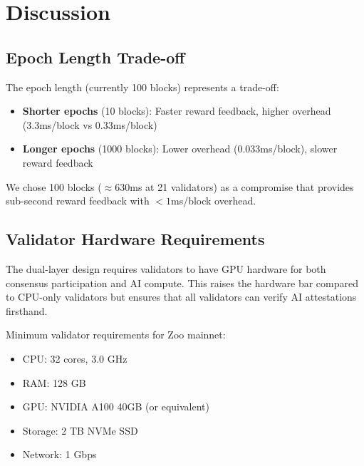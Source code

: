 \section{Discussion}


\subsection{Epoch Length Trade-off}

The epoch length (currently 100 blocks) represents a trade-off:

\begin{itemize}
    \item \textbf{Shorter epochs} (10 blocks): Faster reward feedback, higher overhead (3.3ms/block vs 0.33ms/block)
    \item \textbf{Longer epochs} (1000 blocks): Lower overhead (0.033ms/block), slower reward feedback
\end{itemize}

We chose 100 blocks ($\approx$630ms at 21 validators) as a compromise that provides sub-second reward feedback with $< 1$ms/block overhead.

\subsection{Validator Hardware Requirements}

The dual-layer design requires validators to have GPU hardware for both consensus participation and AI compute. This raises the hardware bar compared to CPU-only validators but ensures that all validators can verify AI attestations firsthand.

Minimum validator requirements for Zoo mainnet:
\begin{itemize}
    \item CPU: 32 cores, 3.0 GHz
    \item RAM: 128 GB
    \item GPU: NVIDIA A100 40GB (or equivalent)
    \item Storage: 2 TB NVMe SSD
    \item Network: 1 Gbps
\end{itemize}

